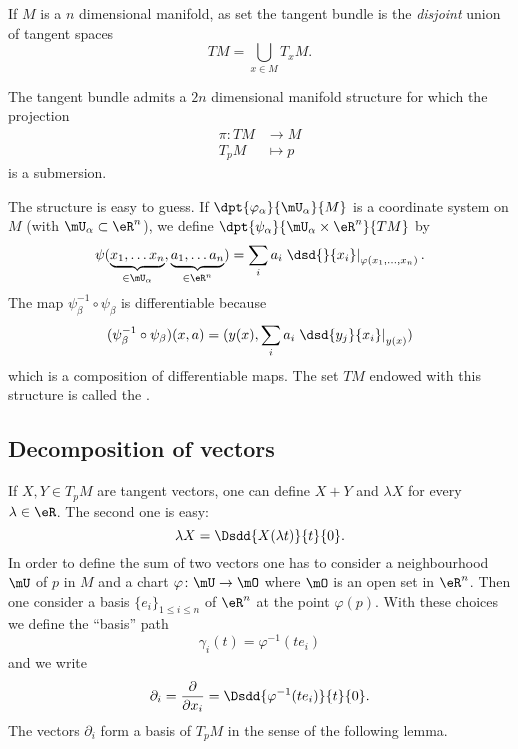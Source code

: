 If $M$ is a $n$ dimensional manifold, as set the tangent bundle is the \emph{disjoint} union of tangent spaces
\begin{equation}
	TM=\bigcup_{x\in M}T_xM.
\end{equation}

\begin{theorem}
	The tangent bundle admits a $2n$ dimensional manifold structure for which the projection
	\begin{equation}
		\begin{aligned}
			\pi \colon TM & \to M     \\
			T_pM          & \mapsto p
		\end{aligned}
	\end{equation}
	is a submersion.
\end{theorem}

The structure is easy to guess. If $\dpt{\varphi_{\alpha}}{\mU_{\alpha}}{M}$ is a coordinate system on $M$ (with $\mU_{\alpha}\subset\eR^n$), we define $\dpt{\psi_{\alpha}}{\mU_{\alpha}\times \eR^n}{TM}$ by
\[
	\psi( \underbrace{x_1,\ldots x_n}_{\in\mU_{\alpha}},\underbrace{a_1,\ldots a_n}_{\in\eR^n}  )
	=\sum_i a_i\left.\dsd{}{x_i}\right|_{\varphi(x_1,\ldots,x_n)}.
\]
The map $\psi_{\beta}^{-1}\circ\psi_{\beta}$ is differentiable because
\[
	(\psi_{\beta}^{-1}\circ\psi_{\beta})(x,a)=( y(x),\sum_i a_i\left.\dsd{y_j}{x_i}\right|_{y(x)}  )
\]
which is a composition of differentiable maps. The set $TM$ endowed with this structure is called the .


\subsection{Decomposition of vectors}

If \( X,Y\in T_pM\) are tangent vectors, one can define \( X+Y\) and \( \lambda X\) for every \( \lambda\in\eR\). The second one is easy:
\begin{equation}
	\lambda X=\Dsdd{ X(\lambda t) }{t}{0}.
\end{equation}
In order to define the sum of two vectors one has to consider a neighbourhood \( \mU\) of \( p\) in \( M\) and a chart \( \varphi\colon \mU\to \mO\) where \( \mO\) is an open set in \( \eR^n\). Then one consider a basis \( \{ e_i \}_{1\leq i\leq n}\) of \( \eR^n\) at the point \( \varphi(p)\). With these choices we define the ``basis'' path
\begin{equation}
	\gamma_i(t)=\varphi^{-1}(te_i)
\end{equation}
and we write
\begin{equation}
	\partial_i=\frac{ \partial  }{ \partial x_i }=\Dsdd{ \varphi^{-1}(te_i) }{t}{0}.
\end{equation}
The vectors \( \partial_i\) form a basis of \( T_pM\) in the sense of the following lemma.

